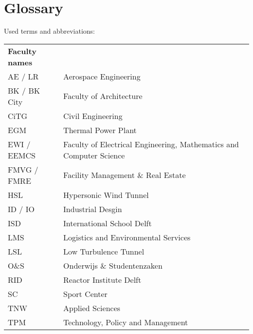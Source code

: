 \chapter{Glossary}
Used terms and abbreviations:
\begin{table}[H]
\label{my-label}
\begin{tabular}{ll}
\textbf{Faculty names} &                                                                     \\
AE / LR                & Aerospace Engineering                                               \\
BK / BK City           & Faculty of Architecture                                             \\
CiTG                   & Civil Engineering                                                   \\
EGM                    & Thermal Power Plant                                                 \\
EWI / EEMCS            & Faculty of Electrical Engineering, Mathematics and Computer Science \\
FMVG / FMRE            & Facility Management \& Real Estate                                  \\
HSL                    & Hypersonic Wind Tunnel                                              \\
ID / IO                & Industrial Desgin                                                   \\
ISD                    & International School Delft                                          \\
LMS                    & Logistics and Environmental Services                                \\
LSL                    & Low Turbulence Tunnel                                               \\
O\&S                   & Onderwijs \& Studentenzaken                                         \\
RID                    & Reactor Institute Delft                                             \\
SC                     & Sport Center                                                        \\
TNW                    & Applied Sciences                                                    \\
TPM                    & Technology, Policy and Management                                   \\
\end{tabular}
\end{table}
